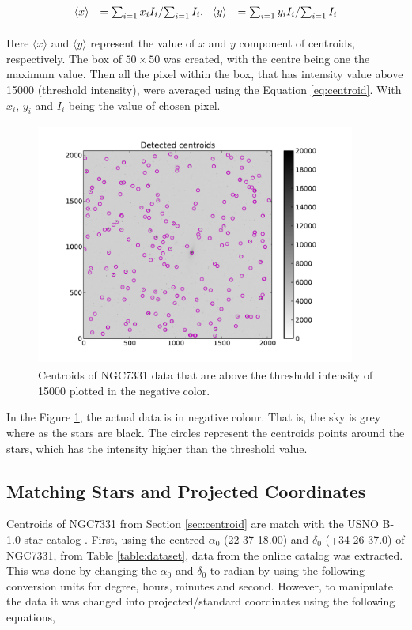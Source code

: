 \documentclass[a4paper,12pt]{article}
\begin{document}
\begin{equation}
\label{eq:centroid}
\begin{array}{rcl}
   \vspace{0.3cm}
   \langle x \rangle &= {\sum_{i=1} x_i I_i}/ {\sum_{i=1} {I_i}}, \ \
   \langle y \rangle &= {\sum_{i=1} y_i I_i}/{\sum_{i=1} {I_i}} 
\end{array}
\end{equation}
Here ${\langle x \rangle}$ and ${\langle y \rangle}$ represent the value of $x$ and $y$ component of centroids, respectively. The box of $50 \times 50$ was created, with the centre being one the maximum value. Then all the pixel within the box, that has intensity value above 15000 (threshold intensity), were averaged using the Equation \ref{eq:centroid}. With $x_i$, $y_i$ and $I_i$ being the value of chosen pixel. 

\begin{figure}[H]
	\centering
	\includegraphics[angle=0,height=8cm,width=10.5cm]{galaxy/Centroids.pdf}
	\caption{Centroids of NGC7331 data that are above the threshold intensity of 15000 plotted in the negative color.}
	\label{fig:centroid}
\end{figure}

In the Figure \ref{fig:centroid}, the actual data is in negative colour. That is, the sky is grey where as the stars are black. The circles represent the centroids points around the stars, which has the intensity higher than the threshold value. 

\subsection{Matching Stars and Projected Coordinates}
\label{sec:matching}
Centroids of NGC7331 from Section \ref{sec:centroid} are match with the USNO B-1.0 star catalog \cite{usno}. First, using the centred $\alpha_0$ (22 37 18.00) and $\delta_0$ (+34 26 37.0) of NGC7331, from Table \ref{table:dataset}, data from the online catalog was extracted. This was done by changing the $\alpha_0$ and $\delta_0$ to radian by using the following conversion units for degree, hours, minutes and second. However, to manipulate the data it was changed into projected/standard coordinates using the following equations,
\end{document}
